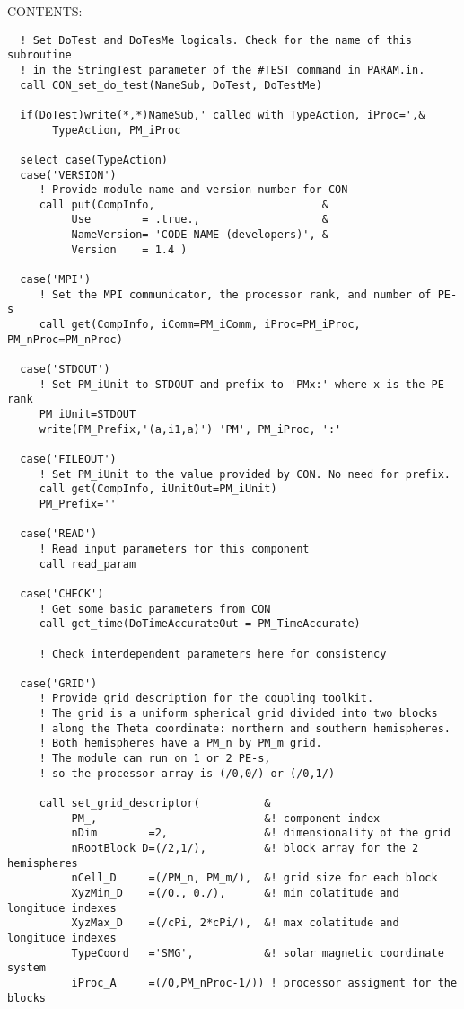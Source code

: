 
\bigskip
{\sf CONTENTS:}
\begin{verbatim}
  ! Set DoTest and DoTesMe logicals. Check for the name of this subroutine
  ! in the StringTest parameter of the #TEST command in PARAM.in.
  call CON_set_do_test(NameSub, DoTest, DoTestMe)

  if(DoTest)write(*,*)NameSub,' called with TypeAction, iProc=',&
       TypeAction, PM_iProc

  select case(TypeAction)
  case('VERSION')
     ! Provide module name and version number for CON
     call put(CompInfo,                          &
          Use        = .true.,                   &
          NameVersion= 'CODE NAME (developers)', &
          Version    = 1.4 )

  case('MPI')
     ! Set the MPI communicator, the processor rank, and number of PE-s
     call get(CompInfo, iComm=PM_iComm, iProc=PM_iProc, PM_nProc=PM_nProc)

  case('STDOUT')
     ! Set PM_iUnit to STDOUT and prefix to 'PMx:' where x is the PE rank
     PM_iUnit=STDOUT_
     write(PM_Prefix,'(a,i1,a)') 'PM', PM_iProc, ':'

  case('FILEOUT')
     ! Set PM_iUnit to the value provided by CON. No need for prefix.
     call get(CompInfo, iUnitOut=PM_iUnit)
     PM_Prefix=''

  case('READ')
     ! Read input parameters for this component
     call read_param

  case('CHECK')
     ! Get some basic parameters from CON
     call get_time(DoTimeAccurateOut = PM_TimeAccurate)

     ! Check interdependent parameters here for consistency

  case('GRID')
     ! Provide grid description for the coupling toolkit.
     ! The grid is a uniform spherical grid divided into two blocks
     ! along the Theta coordinate: northern and southern hemispheres.
     ! Both hemispheres have a PM_n by PM_m grid.
     ! The module can run on 1 or 2 PE-s,
     ! so the processor array is (/0,0/) or (/0,1/)

     call set_grid_descriptor(          &
          PM_,                          &! component index
          nDim        =2,               &! dimensionality of the grid
          nRootBlock_D=(/2,1/),         &! block array for the 2 hemispheres
          nCell_D     =(/PM_n, PM_m/),  &! grid size for each block
          XyzMin_D    =(/0., 0./),      &! min colatitude and longitude indexes
          XyzMax_D    =(/cPi, 2*cPi/),  &! max colatitude and longitude indexes
          TypeCoord   ='SMG',           &! solar magnetic coordinate system
          iProc_A     =(/0,PM_nProc-1/)) ! processor assigment for the blocks


\end{verbatim}
